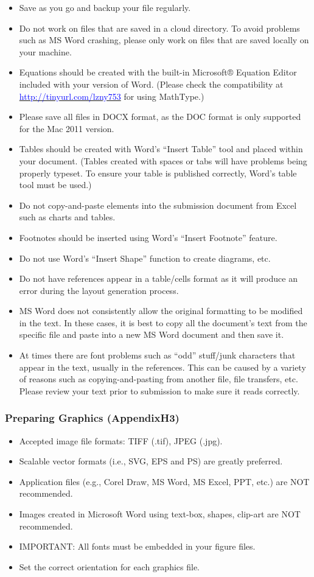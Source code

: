 \documentclass[conference]{IEEEtran}
\begin{document}
\begin{itemize}
\item Save as you go and backup your file regularly.
\item Do not work on files that are saved in a cloud directory. To avoid problems such as MS Word crashing, please only work on files that are saved locally on your machine.
\item Equations should be created with the built-in Microsoft® Equation Editor included with your version of Word. (Please check the compatibility at \href{http://tinyurl.com/lzny753}{\textcolor{blue}{http://tinyurl.com/lzny753}} for using MathType.)
\item Please save all files in DOCX format, as the DOC format is only supported for the Mac 2011 version. 
\item Tables should be created with Word’s “Insert Table” tool and placed within your document. (Tables created with spaces or tabs will have problems being properly typeset. To ensure your table is published correctly, Word’s table tool must be used.)
\item Do not copy-and-paste elements into the submission document from Excel such as charts and tables.
\item Footnotes should be inserted using Word’s “Insert Footnote” feature.
\item Do not use Word’s “Insert Shape” function to create diagrams, etc.
\item Do not have references appear in a table/cells format as it will produce an error during the layout generation process.
\item MS Word does not consistently allow the original formatting to be modified in the text. In these cases, it is best to copy all the document’s text from the specific file and paste into a new MS Word document and then save it.
\item At times there are font problems such as “odd” stuff/junk characters that appear in the text, usually in the references. This can be caused by a variety of reasons such as copying-and-pasting from another file, file transfers, etc. Please review your text prior to submission to make sure it reads correctly.
\end{itemize}
\subsubsection{Preparing Graphics (AppendixH3)}

\begin{itemize}
\item Accepted image file formats: TIFF (.tif), JPEG (.jpg).
\item Scalable vector formats (i.e., SVG, EPS and PS) are greatly preferred. 
\item Application files (e.g., Corel Draw, MS Word, MS Excel, PPT, etc.) are NOT recommended.
\item Images created in Microsoft Word using text-box, shapes, clip-art are NOT recommended.
\item IMPORTANT: All fonts must be embedded in your figure files.
\item Set the correct orientation for each graphics file.
\end{itemize}
\end{document}
